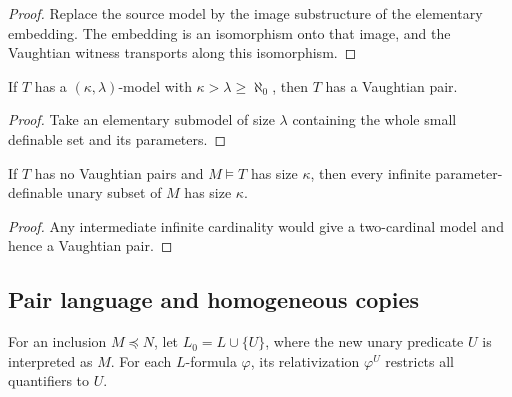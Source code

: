 \begin{proof}
Replace the source model by the image substructure of the elementary
embedding.  The embedding is an isomorphism onto that image, and the
Vaughtian witness transports along this isomorphism.
\end{proof}

\begin{lemma}
\label{lem:kappa-lambda-model-gives-vaughtian-pair}
If \(T\) has a \((\kappa,\lambda)\)-model with
\(\kappa>\lambda\geq\aleph_0\), then \(T\) has a Vaughtian pair.
\end{lemma}

\begin{proof}
Take an elementary submodel of size \(\lambda\) containing the whole
small definable set and its parameters.
\end{proof}

\begin{corollary}
\label{cor:no-small-infinite-definable-sets-without-vaughtian-pairs}
If \(T\) has no Vaughtian pairs and \(M\models T\) has size \(\kappa\),
then every infinite parameter-definable unary subset of \(M\) has size
\(\kappa\).
\end{corollary}

\begin{proof}
Any intermediate infinite cardinality would give a two-cardinal model
and hence a Vaughtian pair.
\end{proof}

\subsection{Pair language and homogeneous copies}

\begin{definition}
\label{def:pair-language}
\leanok
{}
For an inclusion \(M\preceq N\), let \(L_0=L\cup\{U\}\), where the new
unary predicate \(U\) is interpreted as \(M\).  For each \(L\)-formula
\(\varphi\), its relativization \(\varphi^U\) restricts all quantifiers
to \(U\).
\end{definition}

